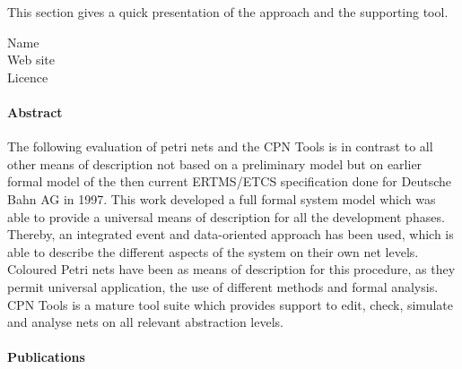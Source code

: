 This section gives a quick presentation of the approach and the supporting tool.

\begin{description}
\item[Name] 
\item[Web site] 
\item[Licence] 
\end{description}

\paragraph{Abstract} 

The following evaluation of petri nets and the CPN Tools is in contrast to all other means of description not based on a preliminary model but on earlier formal model of the then current ERTMS/ETCS specification done for Deutsche Bahn AG in 1997. This work developed a full formal system model which was able to provide a
universal means of description for all the development phases. Thereby, an integrated event and data-oriented approach has been used, which is able to describe the different aspects of the  system  on  their  own net  levels.  Coloured Petri nets have been as means of description for this procedure, as they permit universal application, the use of different methods and formal analysis. CPN Tools is a mature tool suite which provides support to edit, check, simulate and analyse nets on all relevant abstraction levels.


\paragraph{Publications} 


